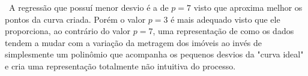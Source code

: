 \documentclass[11pt]{article}
\begin{document}
\begin{exerc}
\begin{enumerate}[a.]
\
A regressão que possuí menor desvio é a de $p = 7$ visto que aproxima melhor os pontos da curva criada. Porém o valor $p = 3$ é mais adequado visto que ele proporciona, ao contrário do valor $p = 7$, uma representação de como os dados tendem a mudar com a variação da metragem dos imóveis ao invés de simplesmente um polinômio que acompanha os pequenos desvios da "curva ideal" e cria uma representação totalmente não intuitiva do processo.


\end{enumerate}
\end{exerc}
\end{document}
